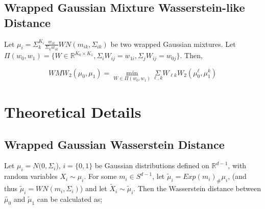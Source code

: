 \documentclass[]{article}
\begin{document}
\subsection{Wrapped Gaussian Mixture Wasserstein-like Distance}

Let $\mu_i = \Sigma_k^{K_i} \frac{w_{ik}}{\Sigma_k w_{ik}}WN(m_{ik},\Sigma_{ik})$ be two wrapped Gaussian mixtures. Let $\Pi(w_0, w_1) = \{ W \in \mathbb{R}^{K_0 \times K_1}, \Sigma_i W_{ij} = w_{1i},\Sigma_j W_{ij} = w_{0j}\}$. Then,

%
%

\begin{equation*}
	WMW_2(\mu_0,\mu_1) = \underset{W \in \Pi(w_0,w_1)}{\min}  \underset{{\ell, k}}{\Sigma} W_{\ell k} W_2(\mu_0^\ell,\mu_1^k)
\end{equation*} 


\newpage

\section{Theoretical Details}\label{Section: theory}

%
%



\subsection{Wrapped Gaussian Wasserstein Distance}

Let $\mu_i = N(0,\Sigma_i$), $i = \{0,1\}$ be Gaussian distributions defined on $\mathbb{R}^{d-1}$, with random variables $X_i \sim \mu_i$. For some $m_i \in S^{d-1}$, let $\tilde{\mu}_i = Exp(m_i)_\#\mu_i$, (and thus $\tilde{\mu}_i = WN(m_i, \Sigma_i)$)   and let $\tilde{X}_i \sim \tilde{\mu}_i$. Then the Wasserstein distance between $\tilde{\mu_0}$ and $\tilde{\mu}_1$ can be calculated as;\\
\end{document}
